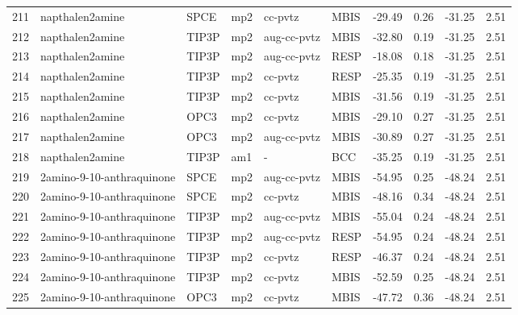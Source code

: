 \begin{tabular}{llllllrrrr}
211 &                napthalen2amine &       SPCE &      mp2 &      cc-pvtz &         MBIS & -29.49 &      0.26 &      -31.25 &     2.51 \\
212 &                napthalen2amine &      TIP3P &      mp2 &  aug-cc-pvtz &         MBIS & -32.80 &      0.19 &      -31.25 &     2.51 \\
213 &                napthalen2amine &      TIP3P &      mp2 &  aug-cc-pvtz &         RESP & -18.08 &      0.18 &      -31.25 &     2.51 \\
214 &                napthalen2amine &      TIP3P &      mp2 &      cc-pvtz &         RESP & -25.35 &      0.19 &      -31.25 &     2.51 \\
215 &                napthalen2amine &      TIP3P &      mp2 &      cc-pvtz &         MBIS & -31.56 &      0.19 &      -31.25 &     2.51 \\
216 &                napthalen2amine &       OPC3 &      mp2 &      cc-pvtz &         MBIS & -29.10 &      0.27 &      -31.25 &     2.51 \\
217 &                napthalen2amine &       OPC3 &      mp2 &  aug-cc-pvtz &         MBIS & -30.89 &      0.27 &      -31.25 &     2.51 \\
218 &                napthalen2amine &      TIP3P &      am1 &            - &          BCC & -35.25 &      0.19 &      -31.25 &     2.51 \\
219 &      2amino-9-10-anthraquinone &       SPCE &      mp2 &  aug-cc-pvtz &         MBIS & -54.95 &      0.25 &      -48.24 &     2.51 \\
220 &      2amino-9-10-anthraquinone &       SPCE &      mp2 &      cc-pvtz &         MBIS & -48.16 &      0.34 &      -48.24 &     2.51 \\
221 &      2amino-9-10-anthraquinone &      TIP3P &      mp2 &  aug-cc-pvtz &         MBIS & -55.04 &      0.24 &      -48.24 &     2.51 \\
222 &      2amino-9-10-anthraquinone &      TIP3P &      mp2 &  aug-cc-pvtz &         RESP & -54.95 &      0.24 &      -48.24 &     2.51 \\
223 &      2amino-9-10-anthraquinone &      TIP3P &      mp2 &      cc-pvtz &         RESP & -46.37 &      0.24 &      -48.24 &     2.51 \\
224 &      2amino-9-10-anthraquinone &      TIP3P &      mp2 &      cc-pvtz &         MBIS & -52.59 &      0.25 &      -48.24 &     2.51 \\
225 &      2amino-9-10-anthraquinone &       OPC3 &      mp2 &      cc-pvtz &         MBIS & -47.72 &      0.36 &      -48.24 &     2.51 \\

\end{tabular}
